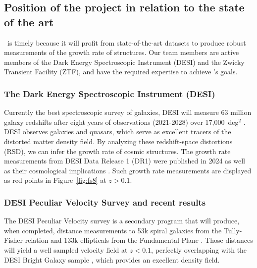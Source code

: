 \newpage 

\subsection{Position of the project in relation to the state of the art}
\label{sec:state-of-the-art}

  \projacro\ is timely because it will profit from state-of-the-art datasets to 
produce robust measurements of the growth rate of structures. Our team members
are active members of the Dark Energy Spectroscopic Instrument (DESI) and 
the Zwicky Transient Facility (ZTF), and have the required expertise to achieve
\projacro's goals. 

\subsubsection*{The Dark Energy Spectroscopic Instrument (DESI)}

  Currently the best spectroscopic survey of galaxies, 
  DESI will measure 63 million galaxy redshifts after eight 
  years of observations (2021-2028) over 17,000~deg$^2$ 
  \cite{desicollaborationOverviewInstrumentationDark2022}. 
  DESI observes galaxies and quasars, which serve as excellent 
  tracers of the distorted matter density field. 
  By analyzing these redshift-space distortions (RSD), 
  we can infer the growth rate of cosmic structures. 
  The growth rate measurements from DESI Data Release 1 (DR1) 
  \cite{desicollaborationDataRelease12025}
  were published in 2024 
  \cite{desicollaborationDESI2024FullShape2025}
  as well as their cosmological implications 
  \cite{desicollaborationDESI2024VII2025,
  forero-sanchezCosmologicalConstraintsJoint2026}.
  Such growth rate measurements are displayed as red points in Figure~\ref{fig:fs8} at $z>0.1$.

\subsubsection*{DESI Peculiar Velocity Survey and recent results}

  The DESI Peculiar Velocity survey is a secondary program 
  that will produce, when completed, distance measurements to 
  53k spiral galaxies from the Tully-Fisher relation and 133k ellipticals 
  from the Fundamental Plane 
  \cite{saulderTargetSelectionDESI2023, 
  saidDESIPeculiarVelocity2024,
  douglassDESIEDRCalibrating2025}.
  Those distances will yield a well sampled velocity field at $z<0.1$, 
  perfectly overlapping with the DESI Bright Galaxy sample 
  \cite{hahnDESIBrightGalaxy2022}, which provides an excellent density field. 

